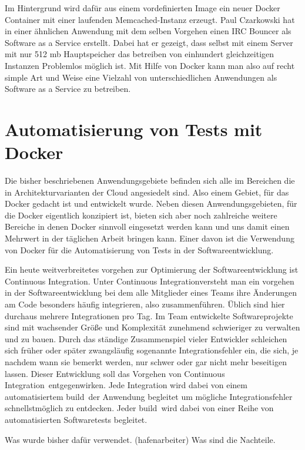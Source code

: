 Im Hintergrund wird dafür aus einem vordefinierten Image ein neuer Docker Container mit einer laufenden Memcached-Instanz erzeugt.
Paul Czarkowski hat in einer ähnlichen Anwendung mit dem selben Vorgehen einen  IRC Bouncer als Software as a Service erstellt. Dabei hat er gezeigt, dass selbst mit einem Server mit nur 512 mb Hauptspeicher das betreiben von einhundert gleichzeitigen Instanzen Problemlos möglich ist. \cite{czarkowski_i_????}
Mit Hilfe von Docker kann man also auf recht simple Art und Weise eine Vielzahl von unterschiedlichen Anwendungen als Software as a Service zu betreiben.

\section{Automatisierung von Tests mit Docker}
\label{sec:automatisierung_von_tests_mit_docker}

Die bisher beschriebenen Anwendungsgebiete befinden sich alle im Bereichen die in Architekturvarianten der Cloud angesiedelt sind. Also einem Gebiet, für das Docker gedacht ist und entwickelt wurde. Neben diesen Anwendungsgebieten, für die Docker eigentlich konzipiert ist, bieten sich aber noch zahlreiche weitere Bereiche in denen Docker sinnvoll eingesetzt werden kann und uns damit einen Mehrwert in der täglichen Arbeit bringen kann.
Einer davon ist die Verwendung von Docker für die Automatisierung von Tests in der Softwareentwicklung.

Ein heute weitverbreitetes vorgehen zur Optimierung der Softwareentwicklung ist \grq Continuous Integration\grq . Unter \grq Continuous Integration\grq versteht man ein vorgehen in der Softwareentwicklung bei dem alle Mitglieder eines Teams ihre Änderungen am Code besonders häufig integrieren, also zusammenführen. Üblich sind hier durchaus mehrere Integrationen pro Tag. 
\glqq Im Team entwickelte Softwareprojekte sind mit wachsender Größe und Komplexität zunehmend schwieriger zu verwalten und zu bauen. Durch das ständige Zusammenspiel vieler Entwickler schleichen sich früher oder später zwangsläufig sogenannte Integrationsfehler ein, die sich, je nachdem wann sie bemerkt werden, nur schwer oder gar nicht mehr beseitigen lassen.\grqq \cite{feustel_continuous_????}
Dieser Entwicklung soll das Vorgehen von \grq Continuous Integration\grq\ entgegenwirken.
Jede Integration wird dabei von einem automatisiertem \grq build\grq\ der Anwendung begleitet um mögliche Integrationsfehler schnellstmöglich zu entdecken. Jeder \grq build\grq\ wird dabei von einer Reihe von automatisierten Softwaretests begleitet.

Was wurde bisher dafür verwendet. (hafenarbeiter) Was sind die Nachteile. 
